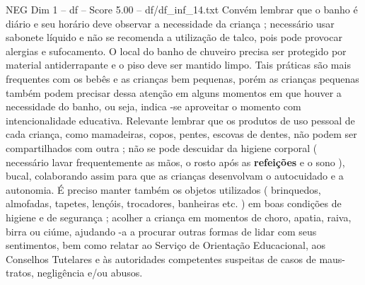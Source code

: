 \begin{textsample}{NEG Dim 1 – df – Score 5.00 – df/df\_inf\_14.txt}
Convém lembrar que o banho é diário e seu horário deve observar a necessidade da criança ; necessário usar sabonete líquido e não se recomenda a utilização de talco, pois pode provocar alergias e sufocamento.
O local do banho de chuveiro precisa ser protegido por material antiderrapante e o piso deve ser mantido limpo.
Tais práticas são mais frequentes com os bebês e as crianças bem pequenas, porém as crianças pequenas também podem precisar dessa atenção em alguns momentos em que houver a necessidade do banho, ou seja, indica -se aproveitar o momento com intencionalidade educativa.
Relevante lembrar que os produtos de uso pessoal de cada criança, como mamadeiras, copos, pentes, escovas de dentes, não podem ser compartilhados com outra ; não se pode descuidar da higiene corporal ( necessário lavar frequentemente as mãos, o rosto após as \textbf{refeições} e o sono ), bucal, colaborando assim para que as crianças desenvolvam o autocuidado e a autonomia.
É preciso manter também os objetos utilizados ( brinquedos, almofadas, tapetes, lençóis, trocadores, banheiras etc. ) em boas condições de higiene e de segurança ; acolher a criança em momentos de choro, apatia, raiva, birra ou ciúme, ajudando -a a procurar outras formas de lidar com seus sentimentos, bem como relatar ao Serviço de Orientação Educacional, aos Conselhos Tutelares e às autoridades competentes suspeitas de casos de maus-tratos, negligência e/ou abusos.

\end{textsample}
